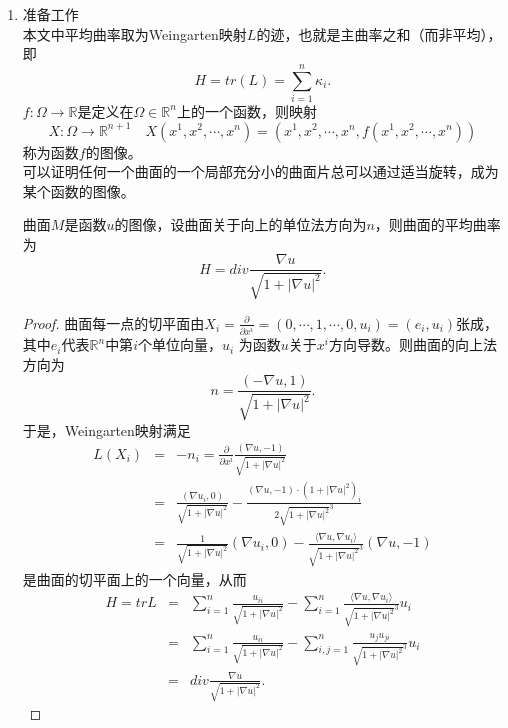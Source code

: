 \begin{enumerate}
\item 准备工作\\
本文中平均曲率取为Weingarten映射$L$的迹，也就是主曲率之和（而非平均），即
\begin{displaymath}
H=tr(L)=\sum_{i=1}^{n}\kappa_{i}.
\end{displaymath}
$f:\Omega\rightarrow \mathbb{R}$是定义在$\Omega\in\mathbb{R}^{n}$上的一个函数，则映射
\begin{displaymath}
X:\Omega\rightarrow\mathbb{R}^{n+1}\quad X(x^{1},x^{2},\cdots,x^{n})=(x^{1},x^{2},\cdots,x^{n},f(x^{1},x^{2},\cdots,x^{n}))
\end{displaymath}
称为函数$f$的图像。\\
可以证明任何一个曲面的一个局部充分小的曲面片总可以通过适当旋转，成为某个函数的图像。
\begin{theorem}
曲面$M$是函数$u$的图像，设曲面关于向上的单位法方向为$n$，则曲面的平均曲率为
\begin{displaymath}
H=div\frac{\nabla u}{\sqrt{1+|\nabla u|^{2}}}.
\end{displaymath}
\end{theorem}
\begin{proof}
曲面每一点的切平面由$X_{i}=\frac{\partial}{\partial x^{i}}=(0,\cdots,1,\cdots,0,u_{i})=(e_{i},u_{i})$张成，其中$e_{i}$代表$\mathbb{R}^{n}$中第$i$个单位向量，$u_{i}$ 为函数$u$关于$x^{i}$方向导数。则曲面的向上法方向为
\begin{displaymath}
n=\frac{(-\nabla u,1)}{\sqrt{1+|\nabla u|^{2}}}.
\end{displaymath}
于是，Weingarten映射满足
\begin{eqnarray*}
L(X_{i})&=&-n_{i}=\frac{\partial}{\partial x^{i}}\frac{(\nabla u,-1)}{\sqrt{1+|\nabla u|^{2}}}\\
&=&\frac{(\nabla u_{i},0)}{\sqrt{1+|\nabla u|^{2}}}-\frac{(\nabla u,-1)\cdot (1+|\nabla u|^{2})_{i}}{2\sqrt{1+|\nabla u|^{2}}^{3}}\\
&=&\frac{1}{\sqrt{1+|\nabla u|^{2}}}(\nabla u_{i},0)-\frac{\langle\nabla u,\nabla u_{i}\rangle}{\sqrt{1+|\nabla u|^{2}}^{3}}(\nabla u,-1)
\end{eqnarray*}
是曲面的切平面上的一个向量，从而
\begin{eqnarray*}
H=trL&=&\sum_{i=1}^{n}\frac{u_{ii}}{\sqrt{1+|\nabla u|^{2}}}-\sum_{i=1}^{n}\frac{\langle\nabla u,\nabla u_{i}\rangle}{\sqrt{1+|\nabla u|^{2}}^{3}}u_{i}\\
&=&\sum_{i=1}^{n}\frac{u_{ii}}{\sqrt{1+|\nabla u|^{2}}}-\sum_{i,j=1}^{n}\frac{u_{j}u_{ji}}{\sqrt{1+|\nabla u|^{2}}^{3}}u_{i}\\
&=&div\frac{\nabla u}{\sqrt{1+|\nabla u|^{2}}}.
\end{eqnarray*}
\end{proof}





\end{enumerate}
